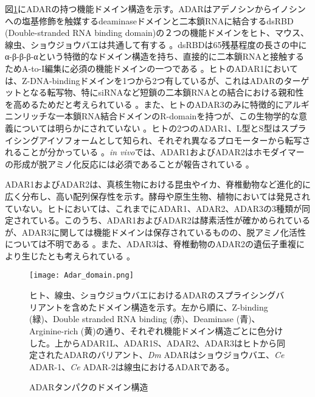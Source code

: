 図\ref{fig:adar_domain}にADARの持つ機能ドメイン構造を示す。ADARはアデノシンからイノシンへの塩基修飾を触媒するdeaminaseドメインと二本鎖RNAに結合するdsRBD (Double-stranded RNA binding domain)の２つの機能ドメインをヒト、マウス、線虫、ショウジョウバエは共通して有する \citep{JinZhaLi0906}。dsRBDは65残基程度の長さの中にα-β-β-β-αという特徴的なドメイン構造を持ち、直接的に二本鎖RNAと接触するためA-to-I編集に必須の機能ドメインの一つである \citep{Barraud:2012aa, ChoYanLee0305, LaiDraNis9507}。ヒトのADAR1においては、Z-DNA-bindingドメインを1つから2つ有しているが、これはADARのターゲットとなる転写物、特にsiRNAなど短鎖の二本鎖RNAとの結合における親和性を高めるためだと考えられている \citep{QiZhaQiu1205}。また、ヒトのADAR3のみに特徴的にアルギニンリッチな一本鎖RNA結合ドメインのR-domainを持つが、この生物学的な意義については明らかにされていない \citep{CheChoWan0005}。ヒトの2つのADAR1、L型とS型はスプライシングアイソフォームとして知られ、それぞれ異なるプロモーターから転写されることが分かっている \citep{KawSam0011}。\textit{in vivo}では、ADAR1およびADAR2はホモダイマーの形成が脱アミノ化反応には必須であることが報告されている \citep{GalKeeRin0307}。
\par
ADAR1およびADAR2は、真核生物における昆虫やイカ、脊椎動物など進化的に広く分布し、高い配列保存性を示す。酵母や原生生物、植物においては発見されていない。ヒトにおいては、これまでにADAR1、ADAR2、ADAR3の3種類が同定されている。このうち、ADAR1およびADAR2は酵素活性が確かめられているが、ADAR3に関しては機能ドメインは保存されているものの、脱アミノ化活性については不明である \citep{Nishikura:2006aa, MelMaaHer9612}。また、ADAR3は、脊椎動物のADAR2の遺伝子重複により生じたとも考えられている \citep{JinZhaLi0906}。

\begin{figure}[!h]
	\begin{center}
		\texttt{[image: Adar\_domain.png]}
	\end{center}
	\caption{ADARタンパクのドメイン構造}
	\begin{flushleft}
		\small{ヒト、線虫、ショウジョウバエにおけるADARのスプライシングバリアントを含めたドメイン構造を示す。左から順に、Z-binding (緑)、Double stranded RNA binding (赤)、Deaminase (青)、Arginine-rich (黄)の通り、それぞれ機能ドメイン構造ごとに色分けした。上からADAR1L、ADAR1S、ADAR2、ADAR3はヒトから同定されたADARのバリアント、\textit{Dm} ADARはショウジョウバエ、\textit{Ce} ADAR-1、\textit{Ce} ADAR-2は線虫におけるADARである。}
	\end{flushleft}
	\label{fig:adar_domain}
\end{figure}

